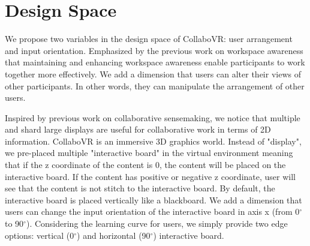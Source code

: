 \documentclass{sigchi}
\begin{document}
\section{Design Space}
We propose two variables in the design space of CollaboVR: user arrangement and input orientation. Emphasized by the previous work on workspace awareness that maintaining and enhancing workspace awareness enable participants to work together more effectively. We add a dimension that users can alter their views of other participants. In other words, they can manipulate the arrangement of other users. 

Inspired by previous work on collaborative sensemaking, we notice that multiple and shard large displays are useful for collaborative work in terms of 2D information. CollaboVR is an immersive 3D graphics world. Instead of "display", we pre-placed multiple "interactive board" in the virtual environment meaning that if the z coordinate of the content is 0, the content will be placed on the interactive board. If the content has positive or negative z coordinate, user will see that the content is not stitch to the interactive board. By default, the interactive board is placed vertically like a blackboard. We add a dimension that users can change the input orientation of the interactive board in axis x (from 0$^{\circ}$ to 90$^{\circ}$). Considering the learning curve for users, we simply provide two edge options: vertical (0$^{\circ}$) and horizontal (90$^{\circ}$) interactive board.
\end{document}
